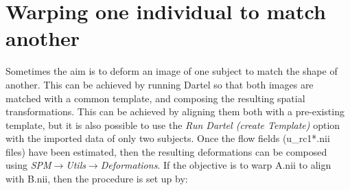 \section{Warping one individual to match another}
Sometimes the aim is to deform an image of one subject to match the shape of another.
This can be achieved by running Dartel so that both images are matched with a common template, and composing the resulting spatial transformations.
This can be achieved by aligning them both with a pre-existing template, but it is also possible to use the \emph{Run Dartel (create Template)} option with the imported data of only two subjects.
Once the flow fields (u\_rc1*.nii files) have been estimated, then the resulting deformations can be composed using \emph{SPM$\rightarrow$Utils$\rightarrow$Deformations}.
If the objective is to warp A.nii to align with B.nii, then the procedure is set up by:
